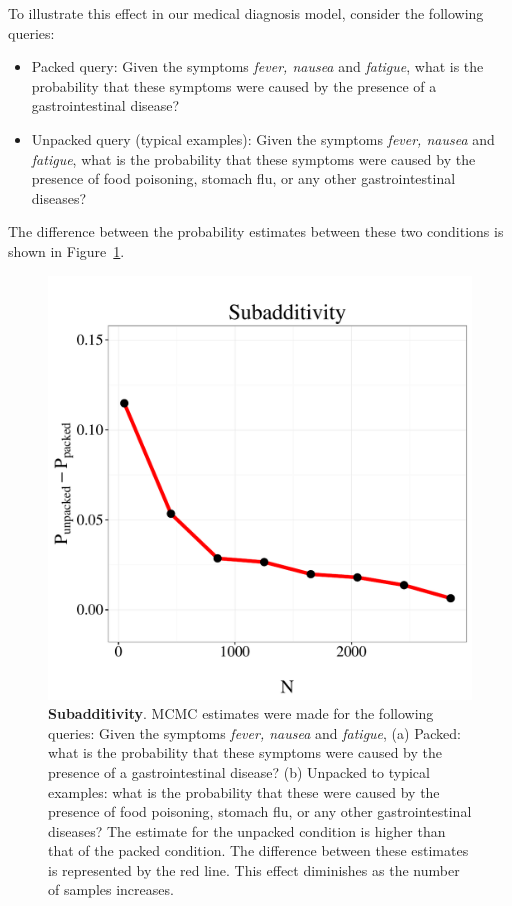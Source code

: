 To illustrate this effect in our medical diagnosis model, consider the following queries: 
\begin{itemize}
\item Packed query: Given the symptoms \emph{fever, nausea} and \emph{fatigue}, what is the probability that these symptoms were caused by the presence of a gastrointestinal disease? 
\item Unpacked query (typical examples): Given the symptoms \emph{fever, nausea} and \emph{fatigue}, what is the probability that these symptoms were caused by the presence of food poisoning, stomach flu, or any other gastrointestinal diseases?
\end{itemize}
The difference between the probability estimates between these two conditions is shown in Figure~\ref{fig:subadd}.

\begin{figure}
\centering
\includegraphics[scale = 0.5]{figures/sub.pdf}
\caption{\textbf{Subadditivity}. MCMC estimates were made for the following queries: Given the symptoms \emph{fever, nausea} and \emph{fatigue}, (a) Packed: what is the probability that these symptoms were caused by the presence of a gastrointestinal disease? (b) Unpacked to typical examples: what is the probability that these were caused by the presence of food poisoning, stomach flu, or any other gastrointestinal diseases? The estimate for the unpacked condition is higher than that of the packed condition. The difference between these estimates is represented by the red line. This effect diminishes as the number of samples increases.}
\label{fig:subadd}
\end{figure}

